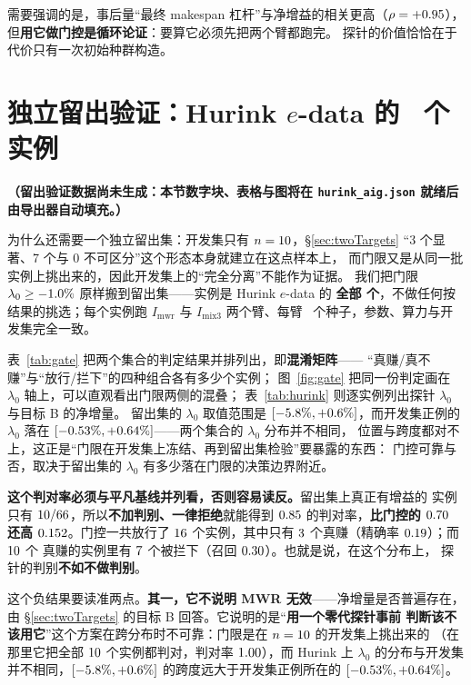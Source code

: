 \documentclass[UTF8, a4paper, 11pt]{ctexart}
\newcommand{\imwr}{I_{\mathrm{mwr}}}
\newcommand{\imix}{I_{\mathrm{mix3}}}
\newcommand{\lam}{\lambda_0}
\begin{document}
需要强调的是，事后量“最终 makespan 杠杆”与净增益的相关更高（$\rho=+0.95$），
但\textbf{用它做门控是循环论证}：要算它必须先把两个臂都跑完。
探针的价值恰恰在于代价只有一次初始种群构造。

\section{独立留出验证：Hurink $e$-data 的 \HKn\ 个实例}\label{sec:hurink}

\ifnum{}
  \noindent\textbf{（留出验证数据尚未生成：本节数字块、表格与图将在
  \texttt{hurink\_aig.json} 就绪后由导出器自动填充。）}
\fi

\noindent 为什么还需要一个独立留出集：开发集只有 $n=10$，\S\ref{sec:twoTargets}
“3 个显著、7 个与 0 不可区分”这个形态本身就建立在这点样本上，
而门限又是从同一批实例上挑出来的，因此开发集上的“完全分离”不能作为证据。
我们把门限 $\lam\ge\HKthr\%$ 原样搬到留出集——实例是 Hurink $e$-data 的
\textbf{全部 \HKn 个}，不做任何按结果的挑选；每个实例跑 $\imwr$ 与 $\imix$
两个臂、每臂 \SetSeeds\ 个种子，参数、算力与开发集完全一致。

\HKverdict

\noindent 表~\ref{tab:gate} 把两个集合的判定结果并排列出，即\textbf{混淆矩阵}——
“真赚/真不赚”与“放行/拦下”的四种组合各有多少个实例；
图~\ref{fig:gate} 把同一份判定画在 $\lam$ 轴上，可以直观看出门限两侧的混叠；
表~\ref{tab:hurink} 则逐实例列出探针 $\lam$ 与目标 B 的净增量。
留出集的 $\lam$ 取值范围是
$[-5.8\%,+0.6\%]$，而开发集正例的 $\lam$ 落在
$[-0.53\%,+0.64\%]$——两个集合的 $\lam$ 分布并不相同，
位置与跨度都对不上，这正是“门限在开发集上冻结、再到留出集检验”要暴露的东西：
门控可靠与否，取决于留出集的 $\lam$ 有多少落在门限的决策边界附近。

\noindent \textbf{这个判对率必须与平凡基线并列看，否则容易读反。}留出集上真正有增益的
实例只有 $10/66$，所以\textbf{不加判别、一律拒绝}就能得到 $0.85$
的判对率，\textbf{比门控的 $0.70$ 还高 $0.152$}。门控一共放行了
$16$ 个实例，其中只有 $3$ 个真赚（精确率 $0.19$）；而 $10$ 个
真赚的实例里有 $7$ 个被拦下（召回 $0.30$）。也就是说，在这个分布上，
探针的判别\textbf{不如不做判别}。

这个负结果要读准两点。\textbf{其一，它不说明 MWR 无效}——净增量是否普遍存在，
由 \S\ref{sec:twoTargets} 的目标 B 回答。它说明的是“\textbf{用一个零代探针事前
判断该不该用它}”这个方案在跨分布时不可靠：门限是在 $n=10$ 的开发集上挑出来的
（在那里它把全部 $10$ 个实例都判对，判对率 $1.00$），而 Hurink 上 $\lam$
的分布与开发集并不相同，$[-5.8\%,+0.6\%]$ 的跨度远大于开发集正例所在的
$[-0.53\%,+0.64\%]$。
\end{document}
